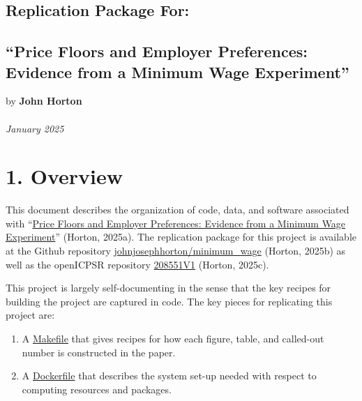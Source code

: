 \documentclass[10pt]{article}
\begin{document}
\begin{center}
\section*{Replication Package For:}
\subsection*{``Price Floors and Employer Preferences: \\ Evidence from a Minimum Wage Experiment''}
by \textbf{John Horton} \\~\\

\textit{January 2025}

\end{center}

\vspace{1em}
\section*{1. Overview}

This document describes the organization of code, data, and software associated with ``\href{https://www.aeaweb.org/articles?id=10.1257/aer.20170637}{Price Floors and Employer Preferences: Evidence from a Minimum Wage Experiment}'' (Horton, 2025a).
The replication package for this project is available at the Github repository \href{https://www.github.com/johnjosephhorton/minimum\_wage.git}{johnjosephhorton/minimum\_wage} (Horton, 2025b) as well as the openICPSR repository \href{http://doi.org/10.3886/E208551V1}{208551V1} (Horton, 2025c).

This project is largely self-documenting in the sense that the key recipes for building the project are captured in code. 
The key pieces for replicating this project are: 

\begin{enumerate}
    \item A \href{https://www.github.com/johnjosephhorton/minimum\_wage/blob/main/writeup/Makefile}{Makefile} that gives recipes for how each figure, table, and called-out number is constructed in the paper.
    \item A \href{https://www.github.com/johnjosephhorton/minimum\_wage/blob/main/writeup/Dockerfile}{Dockerfile} that describes the system set-up needed with respect to computing resources and packages.
\end{enumerate}
\end{document}
